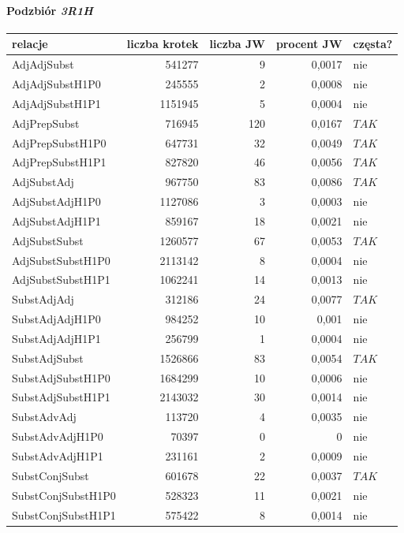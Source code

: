 \documentclass[11pt,a4paper]{llncs}
\begin{document}
\paragraph{Podzbiór \protect\textit{3R1H}}
\begin{table}[h!]
\centering
\begin{tabular}{ l | r | r | r | l }
	\toprule
	\textbf{relacje} 	& \textbf{liczba krotek} & \textbf{liczba JW} & \textbf{procent JW} & \textbf{częsta?} 	\\
	\midrule
	AdjAdjSubst	&	541277	&	9	&	0,0017	&	nie	\\
	AdjAdjSubstH1P0	&	245555	&	2	&	0,0008	&	nie	\\
	AdjAdjSubstH1P1	&	1151945	&	5	&	0,0004	&	nie	\\
	AdjPrepSubst	&	716945	&	120	&	0,0167	&	$ TAK $	\\
	AdjPrepSubstH1P0	&	647731	&	32	&	0,0049	&	$ TAK $	\\
	AdjPrepSubstH1P1	&	827820	&	46	&	0,0056	&	$ TAK $	\\
	AdjSubstAdj	&	967750	&	83	&	0,0086	&	$ TAK $	\\
	AdjSubstAdjH1P0	&	1127086	&	3	&	0,0003	&	nie	\\
	AdjSubstAdjH1P1	&	859167	&	18	&	0,0021	&	nie	\\
	AdjSubstSubst	&	1260577	&	67	&	0,0053	&	$ TAK $	\\
	AdjSubstSubstH1P0	&	2113142	&	8	&	0,0004	&	nie	\\
	AdjSubstSubstH1P1	&	1062241	&	14	&	0,0013	&	nie	\\
	SubstAdjAdj	&	312186	&	24	&	0,0077	&	$ TAK $	\\
	SubstAdjAdjH1P0	&	984252	&	10	&	0,001	&	nie	\\
	SubstAdjAdjH1P1	&	256799	&	1	&	0,0004	&	nie	\\
	SubstAdjSubst	&	1526866	&	83	&	0,0054	&	$ TAK $	\\
	SubstAdjSubstH1P0	&	1684299	&	10	&	0,0006	&	nie	\\
	SubstAdjSubstH1P1	&	2143032	&	30	&	0,0014	&	nie	\\
	SubstAdvAdj	&	113720	&	4	&	0,0035	&	nie	\\
	SubstAdvAdjH1P0	&	70397	&	0	&	0	&	nie	\\
	SubstAdvAdjH1P1	&	231161	&	2	&	0,0009	&	nie	\\
	SubstConjSubst	&	601678	&	22	&	0,0037	&	$ TAK $	\\
	SubstConjSubstH1P0	&	528323	&	11	&	0,0021	&	nie	\\
	SubstConjSubstH1P1	&	575422	&	8	&	0,0014	&	nie	\\

\end{tabular}
\end{table}
\end{document}
